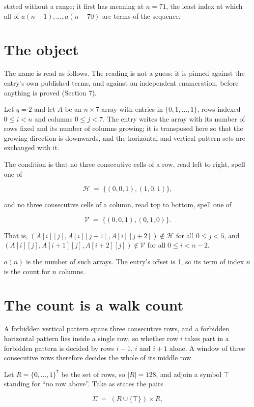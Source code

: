 \documentclass[11pt]{article}
\theoremstyle{definition}
\begin{document}
stated without a range; it first has meaning at $n = 71$, the least index at which all of $a(n-1),\dots,a(n-70)$ are terms of the sequence.

\section{The object}

The name is read as follows. The reading is not a guess: it is pinned against the entry's own published terms, and against an independent enumeration, before anything is proved (Section 7).

Let $q = 2$ and let $A$ be an $n \times 7$ array with entries in $\{0,1,\dots,1\}$, rows indexed $0 \le i < n$ and columns $0 \le j < 7$. The entry writes the array with its number of rows fixed and its number of columns growing; it is transposed here so that the growing direction is downwards, and the horizontal and vertical pattern sets are exchanged with it.

The condition is that no three consecutive cells of a row, read left to right, spell one of

\[\mathcal{H} \;=\; \{(0,0,1), (1,0,1)\},\]

and no three consecutive cells of a column, read top to bottom, spell one of

\[\mathcal{V} \;=\; \{(0,0,1), (0,1,0)\}.\]

That is, $(A[i][j],A[i][j{+}1],A[i][j{+}2]) \notin \mathcal{H}$ for all $0 \le j < 5$, and $(A[i][j],A[i{+}1][j],A[i{+}2][j]) \notin \mathcal{V}$ for all $0 \le i < n-2$.

$a(n)$ is the number of such arrays. The entry's offset is 1, so its term of index $n$ is the count for $n$ columns.

\section{The count is a walk count}

A forbidden vertical pattern spans three consecutive rows, and a forbidden horizontal pattern lies inside a single row, so whether row $i$ takes part in a forbidden pattern is decided by rows $i-1$, $i$ and $i+1$ alone. A window of three consecutive rows therefore decides the whole of its middle row.

Let $R = \{0,\dots,1\}^{7}$ be the set of rows, so $|R| = 128$, and adjoin a symbol $\top$ standing for ``no row above''. Take as states the pairs

\[\Sigma \;=\; (R \cup \{\top\}) \times R,\]
\end{document}
